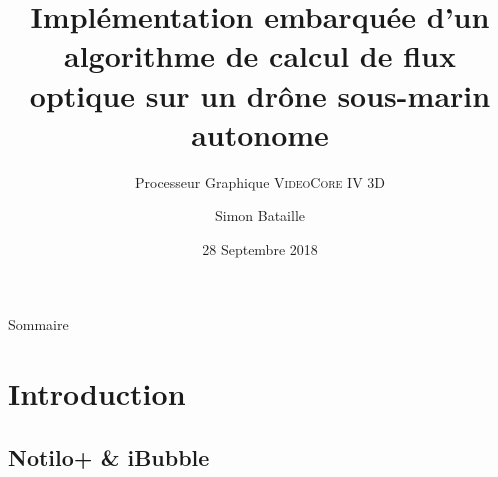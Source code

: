 \documentclass{bredelebeamer}
\title[Calcul du flux optique sur Raspbery Pi]{Implémentation embarquée d'un algorithme de calcul de flux optique sur un dr\^one sous-marin autonome}
\subtitle{Processeur Graphique \textsc{VideoCore IV 3D}}
\author{Simon Bataille\inst{1}}
\institute[Université de Caen Normandie]
{
  \inst{1}%
  ESIX NORMANDIE\\
  Département Mécatronique \& Systèmes Nomades
  }
\date{28 Septembre 2018}
\begin{document}
\begin{frame}
  \titlepage
\end{frame}





\begin{frame}{Sommaire}
  \tableofcontents
\end{frame}





\section{Introduction}


	\subsection{Notilo+ \& iBubble}

\end{document}
